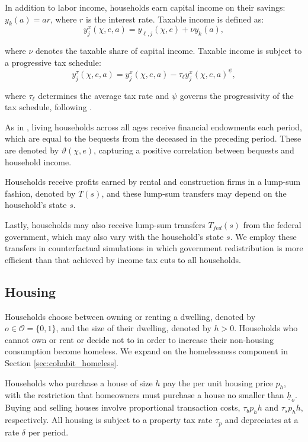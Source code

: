 \documentclass[parskip=full]{article}
\begin{document}
In addition to labor income, households earn capital income on their savings: $y_{k}(a)=ar$, where $r$ is the interest rate. Taxable income is defined as:
\begin{equation*}\label{eq:taxable_labor_income}
  y^{x}_{j}(\chi,e,a) =y_{\ell,j}(\chi,e)+\nu y_{k}(a),
\end{equation*}

\noindent where $\nu$ denotes the taxable share of capital income. Taxable income is subject to a progressive tax schedule:
\begin{equation}\label{eq:income_tax}
  y^{\tau}_{j}(\chi,e,a) = y^{x}_{j}(\chi,e,a)-\tau_{\ell}y^{x}_{j}(\chi,e,a)^{\psi},
\end{equation}

\noindent where $\tau_{\ell}$ determines the average tax rate and $\psi$ governs the progressivity of the tax schedule, following \citet{hsv-2020}.

As in \citet{kkk-2021}, living households across all ages receive financial endowments each period, which are equal to the bequests from the deceased in the preceding period. These are denoted by $\vartheta (\chi,e)$, capturing a positive correlation between bequests and household income.

Households receive profits earned by rental and construction firms in a lump-sum fashion, denoted by $T(s)$, and these lump-sum transfers may depend on the household's state $s$. 

Lastly, households may also receive lump-sum transfers $T_{fed}(s)$ from the federal government, which may also vary with the household’s state $s$. We employ these transfers in counterfactual simulations in which government redistribution is more efficient than that achieved by income tax cuts to all households.

\subsection{Housing}\label{subsection:housing_choice}

Households choose between owning or renting a dwelling, denoted by $o \in \mathcal{O}=\{0,1\}$, and the size of their dwelling, denoted by $h>0$. Households who cannot own or rent or decide not to in order to increase their non-housing consumption become homeless. We expand on the homelessness component in Section \ref{sec:cohabit_homeless}.

Households who purchase a house of size $h$ pay the per unit housing price $p_h$, with the restriction that homeowners must purchase a house no smaller than $\underline{h}_{o}$. Buying and selling houses involve proportional transaction costs, $\tau_{b} p_h h$ and $\tau_{s} p_h h$, respectively. All housing is subject to a property tax rate $\tau_{p}$ and depreciates at a rate $\delta$ per period. 
\end{document}
